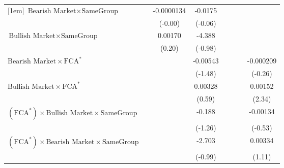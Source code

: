 {\begin{tabular}{l*{7}{c}}
[1em]
$ {\text{Bearish Market} } \times {\text{SameGroup} }  $ &                  &-0.0000134         &  -0.0175         &                  &                  &                  &                  \\
                &                  &  (-0.00)         &  (-0.06)         &                  &                  &                  &                  \\
[1em]
$ {\text{Bullish Market} } \times {\text{SameGroup} }  $ &                  &  0.00170         &   -4.388         &                  &                  &                  &                  \\
                &                  &   (0.20)         &  (-0.98)         &                  &                  &                  &                  \\
[1em]
$ {\text{Bearish Market} } \times \text{FCA}^*  $ &                  &                  & -0.00543         &                  &                  &                  &-0.000209         \\
                &                  &                  &  (-1.48)         &                  &                  &                  &  (-0.26)         \\
[1em]
$ {\text{Bullish Market} } \times \text{FCA}^*   $ &                  &                  &  0.00328         &                  &                  &                  &  0.00152\sym{*}  \\
                &                  &                  &   (0.59)         &                  &                  &                  &   (2.34)         \\
[1em]
$ (\text{FCA}^*) \times {\text{Bullish Market}} \times {\text{SameGroup} }  $ &                  &                  &   -0.188         &                  &                  &                  & -0.00134         \\
                &                  &                  &  (-1.26)         &                  &                  &                  &  (-0.53)         \\
[1em]
$ (\text{FCA}^*) \times {\text{Bearish Market}} \times {\text{SameGroup} }  $ &                  &                  &   -2.703         &                  &                  &                  &  0.00334         \\
                &                  &                  &  (-0.99)         &                  &                  &                  &   (1.11)         \\

\end{tabular}}
